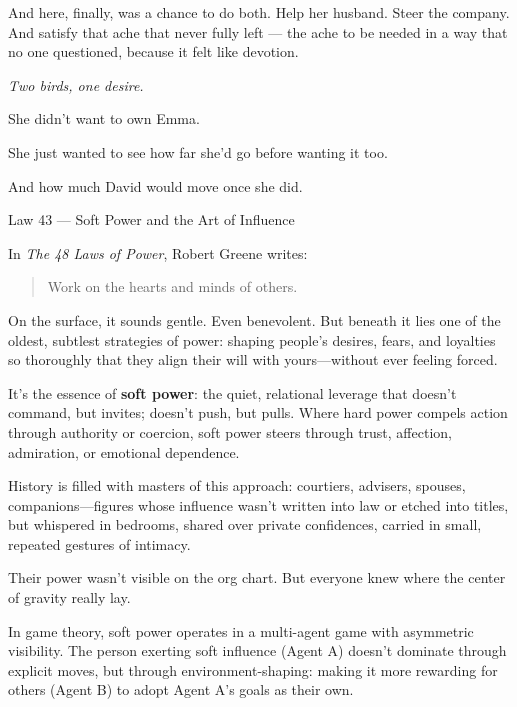And here, finally, was a chance to do both.
Help her husband. Steer the company.
And satisfy that ache that never fully left — the ache to be needed in a way that no one questioned,
because it felt like devotion.

\textit{Two birds, one desire.}

She didn’t want to own Emma.

She just wanted to see how far she’d go before wanting it too.

And how much David would move once she did.

\medskip

\begin{PhilosophicalSidebar}{Law 43 --- Soft Power and the Art of Influence}

  In \textit{The 48 Laws of Power}, Robert Greene writes:
  
  \begin{quote}
  Work on the hearts and minds of others.
  \end{quote}
  
  On the surface, it sounds gentle. Even benevolent. But beneath it lies one of the oldest, subtlest strategies of
  power: shaping people’s desires, fears, and loyalties so thoroughly that they align their will with yours—without
  ever feeling forced.
  
  \medskip
  
  It’s the essence of \textbf{soft power}: the quiet, relational leverage that doesn’t command, but invites; doesn’t
  push, but pulls. Where hard power compels action through authority or coercion, soft power steers through trust,
  affection, admiration, or emotional dependence.
  
  \medskip
  
  History is filled with masters of this approach: courtiers, advisers, spouses, companions—figures whose influence
  wasn’t written into law or etched into titles, but whispered in bedrooms, shared over private confidences, carried
  in small, repeated gestures of intimacy.
  
  \medskip
  
  Their power wasn’t visible on the org chart. But everyone knew where the center of gravity really lay.
  
  \medskip
  
  In game theory, soft power operates in a multi-agent game with asymmetric visibility. The person exerting 
  soft influence (Agent A) doesn’t dominate through explicit moves, but through environment-shaping: making it 
  more rewarding for others (Agent B) to adopt Agent A’s goals as their own.
  

\end{PhilosophicalSidebar}
